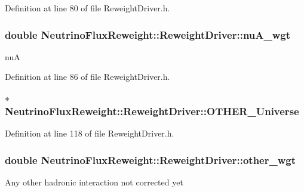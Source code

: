 Definition at line 80 of file Reweight\-Driver.\-h.

\hypertarget{class_neutrino_flux_reweight_1_1_reweight_driver_a1b735257c858f29876af497ea6be5f55}{
\subsubsection[{nu\-A\-\_\-wgt}]{\setlength{\rightskip}{0pt plus 5cm}double Neutrino\-Flux\-Reweight\-::\-Reweight\-Driver\-::nu\-A\-\_\-wgt}}\label{class_neutrino_flux_reweight_1_1_reweight_driver_a1b735257c858f29876af497ea6be5f55}
nu\-A 

Definition at line 86 of file Reweight\-Driver.\-h.

\hypertarget{class_neutrino_flux_reweight_1_1_reweight_driver_a2dc00c13f6d02ff7fb1fdce8f3a07413}{
\subsubsection[{O\-T\-H\-E\-R\-\_\-\-Universe}]{$\ast$ Neutrino\-Flux\-Reweight\-::\-Reweight\-Driver\-::\-O\-T\-H\-E\-R\-\_\-\-Universe}}\label{class_neutrino_flux_reweight_1_1_reweight_driver_a2dc00c13f6d02ff7fb1fdce8f3a07413}


Definition at line 118 of file Reweight\-Driver.\-h.

\hypertarget{class_neutrino_flux_reweight_1_1_reweight_driver_a091fc9bedb46c494e5ffd19b2cb55cc5}{
\subsubsection[{other\-\_\-wgt}]{\setlength{\rightskip}{0pt plus 5cm}double Neutrino\-Flux\-Reweight\-::\-Reweight\-Driver\-::other\-\_\-wgt}}\label{class_neutrino_flux_reweight_1_1_reweight_driver_a091fc9bedb46c494e5ffd19b2cb55cc5}
Any other hadronic interaction not corrected yet 

